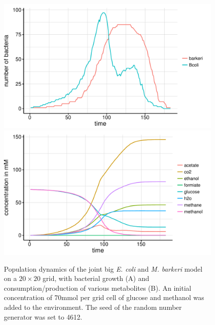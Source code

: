 \begin{figure}[h!]
  \centering
    \includegraphics[scale=0.45]{../results/barkeri_ecoli_20x20_seed4612_growth.pdf}
    \includegraphics[scale=0.45]{../results/barkeri_ecoli_20x20_seed4612_subs.pdf}
  \caption{Population dynamics of the joint big \emph{E. coli} and \emph{M. barkeri} model on a $20\times20$ grid, with bacterial growth (A) and consumption/production of various metabolites (B). An initial concentration of 70\;mmol per grid cell of glucose and methanol was added to the environment. The seed of the random number generator was set to 4612.}
  \label{fig:besg}
\end{figure}
